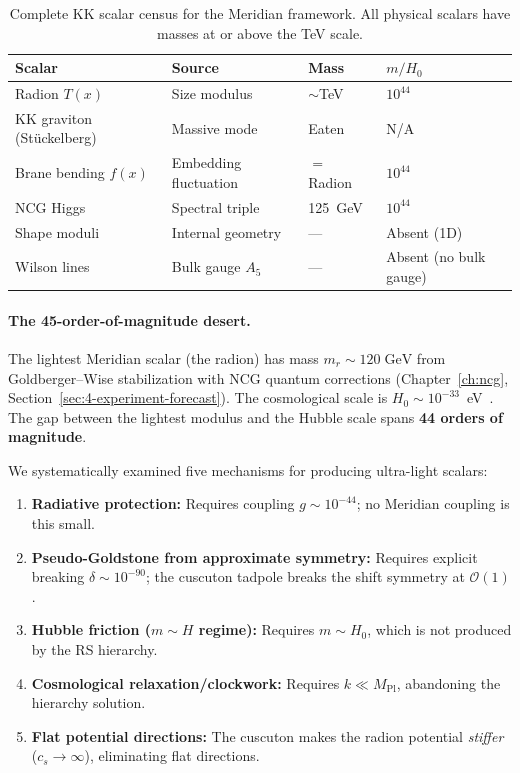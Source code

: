 \begin{table}[htbp]
\centering
\caption{Complete KK scalar census for the Meridian framework. All physical scalars have masses at or above the TeV scale.}
\label{tab:3-kkscalars}
\begin{tabular}{@{}llll@{}}
\toprule
Scalar & Source & Mass & $m/H_0$ \\
\midrule
Radion $T(x)$               & Size modulus                & $\sim$TeV   & $10^{44}$ \\
KK graviton (St\"uckelberg)  & Massive mode                & Eaten       & N/A       \\
Brane bending $f(x)$        & Embedding fluctuation       & $=$ Radion  & $10^{44}$ \\
NCG Higgs                   & Spectral triple             & 125~GeV     & $10^{44}$ \\
Shape moduli                & Internal geometry           & ---         & Absent (1D) \\
Wilson lines                & Bulk gauge $A_5$            & ---         & Absent (no bulk gauge) \\
\bottomrule
\end{tabular}
\end{table}

\paragraph{The 45-order-of-magnitude desert.} The lightest Meridian scalar (the radion) has mass $m_r \sim 120\;\mathrm{GeV}$ from Goldberger--Wise stabilization with NCG quantum corrections (Chapter~\ref{ch:ncg}, Section~\ref{sec:4-experiment-forecast}). The cosmological scale is $H_0 \sim 10^{-33}$~eV~\cite{ch3:riess2022}. The gap between the lightest modulus and the Hubble scale spans \textbf{44 orders of magnitude}.

We systematically examined five mechanisms for producing ultra-light scalars:

\begin{enumerate}
  \item \textbf{Radiative protection:} Requires coupling $g \sim 10^{-44}$; no Meridian coupling is this small.
  \item \textbf{Pseudo-Goldstone from approximate symmetry:} Requires explicit breaking $\delta \sim 10^{-90}$; the cuscuton tadpole breaks the shift symmetry at $\mathcal{O}(1)$.
  \item \textbf{Hubble friction ($m \sim H$ regime):} Requires $m \sim H_0$, which is not produced by the RS hierarchy.
  \item \textbf{Cosmological relaxation/clockwork:} Requires $k \ll M_{\mathrm{Pl}}$, abandoning the hierarchy solution.
  \item \textbf{Flat potential directions:} The cuscuton makes the radion potential \emph{stiffer} ($c_s \to \infty$), eliminating flat directions.
\end{enumerate}

